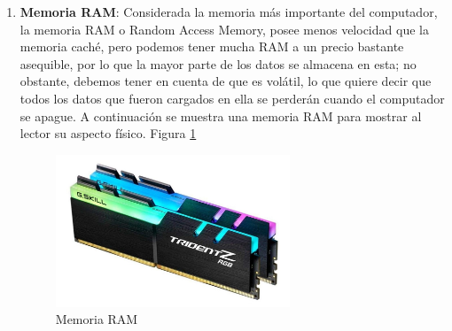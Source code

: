 \documentclass{article}
\begin{document}
\begin{enumerate}
\item \textbf{Memoria RAM}: Considerada la memoria más importante del computador, la memoria RAM o Random Access Memory, posee menos velocidad que la memoria caché, pero podemos tener mucha RAM a un precio bastante asequible, por lo que la mayor parte de los datos se almacena en esta; no obstante, debemos tener en cuenta de que es volátil, lo que quiere decir que todos los datos que fueron cargados en ella se perderán cuando el computador se apague. A continuación se muestra una memoria RAM para mostrar al lector su aspecto físico. Figura \ref{fig:memoriaram}
    \begin{figure}[h]
        \centering
        \includegraphics[width=7cm]{Memoria RAM.jpg}
        \caption{Memoria RAM}
        \label{fig:memoriaram}
    \end{figure}
    

\end{enumerate}
\end{document}
